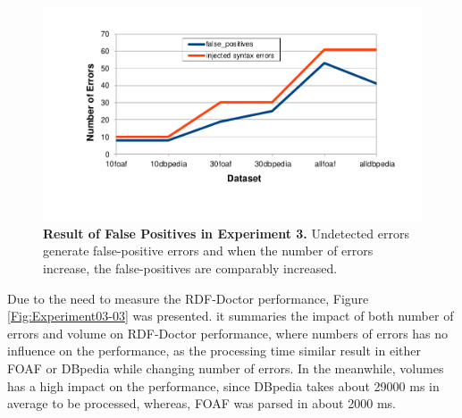 \begin{figure}[ht]
\begin{center}
		\includegraphics[scale=0.9,angle=0]{images/Experiment03-02.pdf}
		\setlength\belowcaptionskip{-5mm}
		\setlength\abovecaptionskip{-15mm}
		\caption{\textbf{Result of False Positives in Experiment 3.} Undetected errors generate false-positive errors and when the number of errors increase, the false-positives are comparably increased.}
				\label{Fig:Experiment03-02}
\end{center}
\end{figure}

Due to the need to measure the RDF-Doctor performance, Figure \ref{Fig:Experiment03-03} was presented. it summaries the impact of both number of errors and volume on RDF-Doctor performance, where numbers of errors has no influence on the performance, as the processing time similar result in either FOAF or DBpedia while changing number of errors. In the meanwhile, volumes has a high impact on the performance, since  DBpedia  takes about 29000 ms in average to be processed, whereas, FOAF was parsed in about 2000 ms.   

